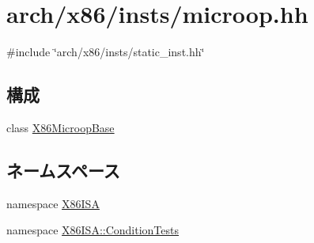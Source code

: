 \hypertarget{microop_8hh}{
\section{arch/x86/insts/microop.hh}
\label{microop_8hh}
}
{\ttfamily \#include \char`\"{}arch/x86/insts/static\_\-inst.hh\char`\"{}}\par
\subsection*{構成}
\begin{DoxyCompactItemize}
\item 
class \hyperlink{classX86ISA_1_1X86MicroopBase}{X86MicroopBase}
\end{DoxyCompactItemize}
\subsection*{ネームスペース}
\begin{DoxyCompactItemize}
\item 
namespace \hyperlink{namespaceX86ISA}{X86ISA}
\item 
namespace \hyperlink{namespaceX86ISA_1_1ConditionTests}{X86ISA::ConditionTests}
\end{DoxyCompactItemize}
